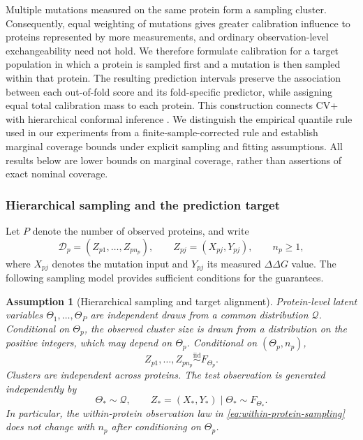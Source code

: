 \documentclass[11pt]{article}
\newtheorem{assumption}{Assumption}
\begin{document}
Multiple mutations measured on the same protein form a sampling cluster. Consequently, equal weighting of mutations gives greater calibration influence to proteins represented by more measurements, and ordinary observation-level exchangeability need not hold. We therefore formulate calibration for a target population in which a protein is sampled first and a mutation is then sampled within that protein. The resulting prediction intervals preserve the association between each out-of-fold score and its fold-specific predictor, while assigning equal total calibration mass to each protein. This construction connects CV+ \cite{barber2021jackknife,angelopoulos2024theoretical} with hierarchical conformal inference \cite{lee2025hierarchical}. We distinguish the empirical quantile rule used in our experiments from a finite-sample-corrected rule and establish marginal coverage bounds under explicit sampling and fitting assumptions. All results below are lower bounds on marginal coverage, rather than assertions of exact nominal coverage.

\subsubsection{Hierarchical sampling and the prediction target}

Let $P$ denote the number of observed proteins, and write
\begin{equation}
 \mathcal D_p=(Z_{p1},\ldots,Z_{pn_p}),\qquad
 Z_{pj}=(X_{pj},Y_{pj}),\qquad n_p\geq1,
 \label{eq:protein-clusters}
\end{equation}
where $X_{pj}$ denotes the mutation input and $Y_{pj}$ its measured $\Delta\Delta G$ value. The following sampling model provides sufficient conditions for the guarantees.

\begin{assumption}[Hierarchical sampling and target alignment]
\label{ass:hierarchical-sampling}
Protein-level latent variables $\Theta_1,\ldots,\Theta_P$ are independent draws from a common distribution $\mathcal Q$. Conditional on $\Theta_p$, the observed cluster size is drawn from a distribution on the positive integers, which may depend on $\Theta_p$. Conditional on $(\Theta_p,n_p)$,
\begin{equation}
 Z_{p1},\ldots,Z_{pn_p}
 \overset{\mathrm{iid}}{\sim} F_{\Theta_p}.
 \label{eq:within-protein-sampling}
\end{equation}
Clusters are independent across proteins. The test observation is generated independently by
\begin{equation}
 \Theta_*\sim\mathcal Q,\qquad
 Z_*=(X_*,Y_*)\mid\Theta_*\sim F_{\Theta_*}.
 \label{eq:protein-target}
\end{equation}
In particular, the within-protein observation law in \eqref{eq:within-protein-sampling} does not change with $n_p$ after conditioning on $\Theta_p$.
\end{assumption}
\end{document}
